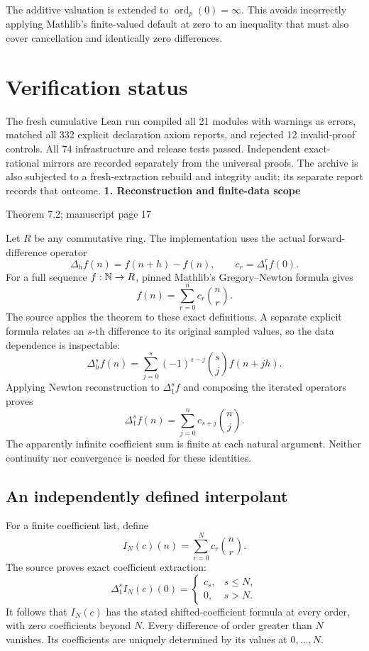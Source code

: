 \documentclass[11pt]{article}
\newcommand{\pageheading}[2]{{\Large\bfseries\color{ink}#1}\par{\small #2}\par\medskip}
\newcommand{\ord}{\operatorname{ord}}
\begin{document}
The additive valuation is extended to $\ord_p(0)=\infty$. This avoids incorrectly applying Mathlib's finite-valued default at zero to an inequality that must also cover cancellation and identically zero differences.

\section*{Verification status}
The fresh cumulative Lean run compiled all 21 modules with warnings as errors, matched all 332 explicit declaration axiom reports, and rejected 12 invalid-proof controls. All 74 infrastructure and release tests passed. Independent exact-rational mirrors are recorded separately from the universal proofs. The archive is also subjected to a fresh-extraction rebuild and integrity audit; its separate report records that outcome.
\newpage
\pageheading{1. Reconstruction and finite-data scope}{Theorem 7.2; manuscript page 17}
Let $R$ be any commutative ring. The implementation uses the actual forward-difference operator
\[
 \Delta_h f(n)=f(n+h)-f(n),\qquad c_r=\Delta_1^r f(0).
\]
For a full sequence $f:\mathbb N\to R$, pinned Mathlib's Gregory--Newton formula gives
\[
 \boxed{f(n)=\sum_{r=0}^{n}c_r\binom nr.}
\]
The source applies the theorem to these exact definitions. A separate explicit formula relates an $s$-th difference to its original sampled values, so the data dependence is inspectable:
\[
 \Delta_h^s f(n)=\sum_{j=0}^{s}(-1)^{s-j}\binom sj f(n+jh).
\]
Applying Newton reconstruction to $\Delta_1^s f$ and composing the iterated operators proves
\[
 \boxed{\Delta_1^s f(n)=\sum_{j=0}^{n}c_{s+j}\binom nj.}
\]
The apparently infinite coefficient sum is finite at each natural argument. Neither continuity nor convergence is needed for these identities.

\subsection*{An independently defined interpolant}
For a finite coefficient list, define
\[
 I_N(c)(n)=\sum_{r=0}^{N}c_r\binom nr.
\]
The source proves exact coefficient extraction:
\[
 \Delta_1^s I_N(c)(0)=
 \begin{cases}c_s,&s\leq N,\\0,&s>N.\end{cases}
\]
It follows that $I_N(c)$ has the stated shifted-coefficient formula at every order, with zero coefficients beyond $N$. Every difference of order greater than $N$ vanishes. Its coefficients are uniquely determined by its values at $0,\ldots,N$.
\end{document}
